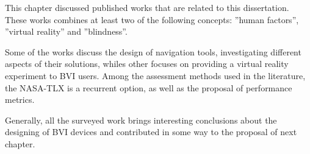 This chapter discussed published works that are related to this dissertation. These works combines at least two of the following concepts: ”human factors”, ”virtual reality” and ”blindness”. 

Some of the works discuss the design of navigation tools, investigating different aspects of their solutions, whiles other focuses on providing a virtual reality experiment to BVI users. Among the assessment methods used in the literature, the NASA-TLX is a recurrent option, as well as the proposal of performance metrics.

Generally, all the surveyed work brings interesting conclusions about the designing of BVI devices and contributed in some way to the proposal of next chapter.

